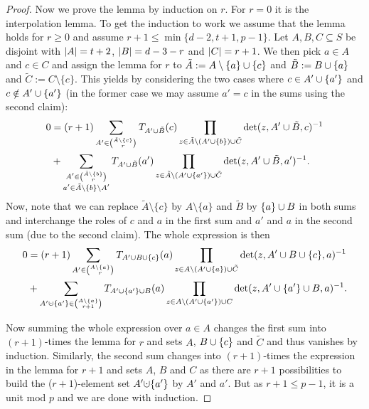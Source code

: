 \documentclass[a4paper]{article}
\begin{document}
\begin{proof}
  Now we prove the lemma by induction on $r$. For $r=0$ it is the interpolation lemma.
  To get the induction to work we assume that the lemma holds for $r\geq 0$ and assume $r+1\leq\min\{d-2,t+1,p-1\}$.
  Let $A,B,C\subseteq S$ be disjoint with $\left|A\right|=t+2$, $\left|B\right|=d-3-r$ and $\left|C\right|=r+1$. We then pick $a\in A$ and $c\in C$ and assign the lemma for $r$ to
  $\tilde{A}:=A\setminus\{a\}\cup\{c\}$ and $\tilde{B}:=B\cup\{a\}$ and $\tilde{C}:=C\setminus\{c\}$. 
  This yields by considering the two cases where $c\in A'\cup\{a'\}$ and $c\notin A'\cup\{a'\}$ (in the former case we may assume $a'=c$ in the sums using the second claim):
  \begin{align}
    0 & = (r+1)\sum_{A'\in\binom{\tilde{A}\setminus\{c\}}{r}}{T_{A'\setjoin\tilde{B}}(c)\prod_{z\in \tilde{A}\setminus (A'\setjoin\{b\})\setjoin \tilde{C}}\det(z,A'\setjoin\tilde{B},c)^{-1}}\\
      & + \sum_{\substack{A'\in\binom{\tilde{A}\setminus\{b\}}{r}\\ a'\in \tilde{A}\setminus\{b\}\setminus A'}}{T_{A'\setjoin\tilde{B}}(a')\prod_{z\in \tilde{A}\setminus (A'\setjoin\{a'\})\setjoin \tilde{C}}\det(z,A'\setjoin\tilde{B},a')^{-1}}\text{.}
  \end{align}
  Now, note that we can replace $\tilde{A}\setminus \{c\}$ by $A\setminus\{a\}$ and $\tilde{B}$ by $\{a\}\cup B$ in both sums and interchange the roles of $c$ and $a$ in the first sum and $a'$ and $a$ in the second sum (due to the second claim). The whole expression is then
  \begin{align}
    0 & = (r+1)\sum_{A'\in\binom{A\setminus\{a\}}{r}}{T_{A'\setjoin B\setjoin\{c\}}(a)\prod_{z\in A\setminus (A'\setjoin \{a\})\setjoin\tilde{C}}{\det(z,A'\setjoin B\setjoin\{c\},a)^{-1}}}\\
    & + \sum_{A'\distjoin\{a'\}\in\binom{A\setminus\{a\}}{r+1}}{T_{A'\setjoin\{a'\}\setjoin B}(a)\prod_{z\in A\setminus (A'\setjoin\{a'\})\setjoin C}{\det(z,A'\setjoin\{a'\}\setjoin B,a)^{-1}}}\text{.}
  \end{align}

  Now summing the whole expression over $a\in A$ changes the first sum into $(r+1)$-times the lemma for $r$ and sets $A$, $B\cup\{c\}$ and $\tilde{C}$ and thus vanishes by induction. Similarly, the second sum changes into $(r+1)$-times the expression in the lemma for $r+1$ and sets $A$, $B$ and $C$ as there are $r+1$ possibilities to build the ($r+1$)-element set $A'\distjoin\{a'\}$ by $A'$ and $a'$. But as $r+1\leq p-1$, it is a unit mod $p$ and we are done with induction.
\end{proof}
\end{document}
